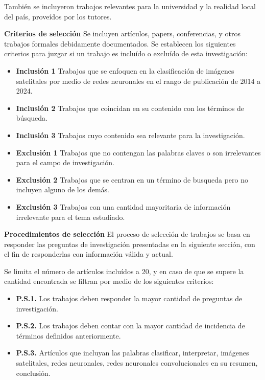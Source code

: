 También se incluyeron trabajos relevantes para la universidad y la realidad local del país, proveídos por los tutores.

{\bf Criterios de selección} Se incluyen artículos, papers, conferencias, y otros trabajos formales debidamente
documentados. Se establecen los siguientes criterios para juzgar si un trabajo es incluído o excluído de esta
investigación:

\vspace{-\topsep}
\begin{itemize}
    \setlength{\parskip}{0pt}
    \setlength{\itemsep}{0pt plus 1pt}
    \item[] {\bf Inclusión 1} Trabajos que se enfoquen en la clasificación de imágenes satelitales por medio de redes
        neuronales en el rango de publicación de 2014 a 2024.
    \item[] {\bf Inclusión 2} Trabajos que coincidan en su contenido con los términos de búsqueda.
    \item[] {\bf Inclusión 3} Trabajos cuyo contenido sea relevante para la investigación.
    \item[] {\bf Exclusión 1} Trabajos que no contengan las palabras claves o son irrelevantes para el campo de
        investigación.
    \item[] {\bf Exclusión 2} Trabajos que se centran en un término de busqueda pero no incluyen alguno de los demás.
    \item[] {\bf Exclusión 3} Trabajos con una cantidad mayoritaria de información irrelevante para el tema estudiado.
\end{itemize}
\vspace{-\topsep}

{\bf Procedimientos de selección} El proceso de selección de trabajos se basa en responder las preguntas de
investigación presentadas en la siguiente sección, con el fin de responderlas con información válida y actual.

Se limita el número de artículos incluídos a 20, y en caso de que se supere la cantidad encontrada se filtran por medio
de los siguientes criterios:

\begin{itemize}
    \item[] {\bf P.S.1.} Los trabajos deben responder la mayor cantidad de preguntas de investigación.
    \item[] {\bf P.S.2.} Los trabajos deben contar con la mayor cantidad de incidencia de términos definidos
        anteriormente.
    \item[] {\bf P.S.3.} Artículos que incluyan las palabras clasificar, interpretar, imágenes satelitales, redes
        neuronales, redes neuronales convolucionales en su resumen, conclusión.
\end{itemize}

